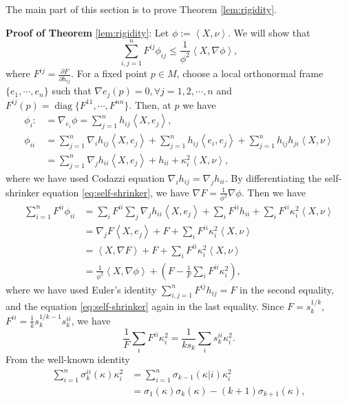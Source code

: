 \documentclass[reqno]{amsart}
\theoremstyle{remark}
\newcommand{\pd}[2]{\frac{\partial {#1}}{\partial {#2}}}
\newcommand{\ip}[2]{\ensuremath{\left< {#1}, {#2} \right>}}
\newcommand{\diag}[1]{\ensuremath{\operatorname{diag}\{ #1 \}}}
\theoremstyle{definition}
\numberwithin{equation}{section}
\begin{document}
The main part of this section is to prove Theorem \ref{lem:rigidity}.  

\textbf{Proof of Theorem }{\ref{lem:rigidity}}: 
    Let \(\phi := \ip{X}{\nu}\). We will show that 
    \[ \sum_{i,j=1}^{n} F^{ij}\phi_{ij} \leq \frac{1}{\phi^2}\ip{X}{\nabla \phi}, \]
    where \(F^{ij} = \pd{F}{h_{ij}}\). For a fixed point \(p\in M\), choose a local orthonormal frame \(\{e_1,\cdots,e_n\}\) such that \(\nabla e_j(p) = 0, \forall j=1,2,\cdots,n\) and \(F^{ij}(p) = \diag{F^{11},\cdots,F^{nn}}\). Then, at \(p\) we have 
    \[ \begin{aligned}
        \phi_i :&= \nabla_{e_i}\phi = \sum_{j=1}^n h_{ij}\ip{X}{e_j},\\
        \phi_{ii} &= \sum_{j=1}^{n}\nabla_i h_{ij}\ip{X}{e_j} + \sum_{j=1}^{n}h_{ij}\ip{e_i}{e_j} + \sum_{j=1}^{n}h_{ij}h_{ji}\ip{X}{\nu} \\
        &= \sum_{j=1}^{n}\nabla_j h_{ii}\ip{X}{e_j} + h_{ii} + \kappa_i^2\ip{X}{\nu},
    \end{aligned} \]
    where we have used Codazzi equation \(\nabla_i h_{ij} = \nabla_j h_{ii}\). By differentiating the self-shrinker equation \eqref{eq:self-shrinker}, we have \(\nabla F = \frac{1}{\phi^2}\nabla \phi\). Then we have 
    \begin{equation}\label{eq:rigid}
        \begin{aligned}
            \sum_{i=1}^{n} F^{ii} \phi_{ii} &= \sum_i F^{ii}\sum_j \nabla_j h_{ii}\ip{X}{e_j} + \sum_i F^{ii}h_{ii} + \sum_i F^{ii}\kappa_i^2 \ip{X}{\nu} \\
            &= \nabla_j F \ip{X}{e_j} + F + \sum_i F^{ii}\kappa_i^2 \ip{X}{\nu} \\
            &=  \ip{X}{\nabla F} + F + \sum_i F^{ii}\kappa_i^2 \ip{X}{\nu} \\
            &= \frac{1}{\phi^2}\ip{X}{\nabla \phi} + \left( F - \frac{1}{F}\sum_i F^{ii}\kappa_i^2\right), 
        \end{aligned}
    \end{equation} 
    where we have used Euler's identity \(\sum_{i,j=1}^{n}F^{ij}h_{ij} = F\) in the second equality, and the equation \eqref{eq:self-shrinker} again in the last equality. Since \(F = s_k^{1/k}\), \(F^{ii} = \frac{1}{k}s_k^{1/k-1}s_k^{ii}\),  we have 
    \[ \frac{1}{F}\sum_i F^{ii}\kappa_i^2 = \frac{1}{k s_k}\sum_i s_k^{ii}\kappa_i^2. \]
    From the well-known identity  
    \[ \begin{aligned}
        \sum_{i=1}^n \sigma_k^{ii}(\kappa)\kappa_i^2 &= \sum_{i=1}^n \sigma_{k-1}(\kappa | i) \kappa_i^2 \\
        &= \sigma_1(\kappa)\sigma_k(\kappa) - (k+1)\sigma_{k+1}(\kappa),
    \end{aligned}  \]
\end{document}
